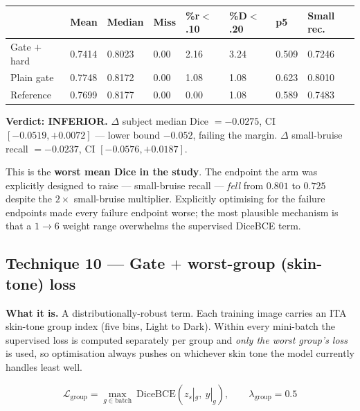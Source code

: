 \documentclass[11pt]{article}
\newcommand{\lose}[1]{\textcolor{losered}{#1}}
\begin{document}
\begin{center}\small
\begin{tabular}{K q q q q q q M}
\toprule
& \textbf{Mean} & \textbf{Median} & \textbf{Miss} & \textbf{\%r$<$.10} & \textbf{\%D$<$.20} &
\textbf{p5} & \textbf{Small rec.} \\
\midrule
Gate $+$ hard & \lose{0.7414} & 0.8023 & 0.00 & 2.16 & 3.24 & \lose{0.509} & 0.7246 \\
Plain gate    & 0.7748 & 0.8172 & 0.00 & 1.08 & 1.08 & 0.623 & 0.8010 \\
Reference     & 0.7699 & 0.8177 & 0.00 & 0.00 & 1.08 & 0.589 & 0.7483 \\
\bottomrule
\end{tabular}
\end{center}

\textbf{Verdict: \lose{INFERIOR}.}
$\Delta$ subject median Dice $=-0.0275$, CI $[-0.0519,+0.0072]$ --- lower bound $-0.052$, failing
the margin. $\Delta$ small-bruise recall $=-0.0237$, CI $[-0.0576,+0.0187]$.

This is the \textbf{worst mean Dice in the study}. The endpoint the arm was explicitly designed to
raise --- small-bruise recall --- \emph{fell} from $0.801$ to $0.725$ despite the $2\times$
small-bruise multiplier. Explicitly optimising for the failure endpoints made every failure
endpoint worse; the most plausible mechanism is that a $1\to6$ weight range overwhelms the
supervised DiceBCE term.

\subsection{Technique 10 --- Gate $+$ worst-group (skin-tone) loss}

\textbf{What it is.} A distributionally-robust term. Each training image carries an ITA skin-tone
group index (five bins, Light to Dark). Within every mini-batch the supervised loss is computed
separately per group and \emph{only the worst group's loss} is used, so optimisation always pushes
on whichever skin tone the model currently handles least well.

\[
  \mathcal{L}_{\text{group}}=\max_{g\in\text{batch}}\ \mathrm{DiceBCE}(z_s|_g,\ y|_g),
  \qquad \lambda_{\text{group}}=0.5
\]
\end{document}
